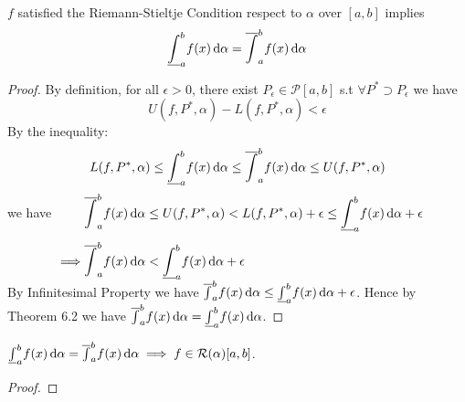 \documentclass[
	UTF-8,
	11pt, %
	a4paper, %
]{LegrandOrangeBook}
\begin{document}
    \newpage

    \newcommand{\lowerint}{\underline{\int}}
    \newcommand{\upperint}{\overline{\int}}

    \begin{lemma}
        $f$ satisfied the
        Riemann-Stieltje Condition respect to $\alpha$ over $[a,b] $ implies
        $$ \underline{\int}_{a}^{b}f(x) \, \mathrm{d} \alpha = \overline{\int}_{a}^{b}f(x) \, \mathrm{d} \alpha$$
    \end{lemma} 

    \begin{proof}
        By definition, for all  $\epsilon > 0$, 
        there exist $P_{\epsilon} \in \mathcal{P}[a,b]$ s.t $\forall P^{*} \supset P_{\epsilon}$ we have
        $$
            U(f,P^{*},\alpha) - L(f,P^{*},\alpha) < \epsilon
        $$
        By the inequality:
        $$
            L(f,P^*,\alpha) \leq \lowerint^{b}_a f(x) \diffd \alpha \leq \upperint^{b}_a f(x) \diffd \alpha \leq U(f,P^*,\alpha)
        $$
        we have
        $
        \begin{aligned}[t]
        &\upperint^{b}_a f(x) \diffd \alpha \leq U(f,P^*,\alpha) < L(f,P^*,\alpha) +\epsilon \leq \lowerint^{b}_a f(x) \diffd \alpha+\epsilon\\[1ex]
        \implies &\upperint^{b}_a f(x) \diffd \alpha < \lowerint^{b}_a f(x) \diffd \alpha + \epsilon
        \end{aligned}
        $\\

        By Infinitesimal Property we have 
        $\upperint^{b}_a f(x) \diffd \alpha \leq \lowerint^{b}_a f(x) \diffd \alpha + \epsilon$.
        Hence by Theorem 6.2 we have $\upperint^{b}_a f(x) \diffd \alpha = \lowerint^{b}_a f(x) \diffd \alpha$.
    \end{proof}

    \begin{lemma}
        $ \underline{\int}_{a}^{b}f(x) \, \mathrm{d} \alpha = \overline{\int}_{a}^{b}f(x) \, \mathrm{d} \alpha \implies f\in \mathcal{R}(\alpha)[a,b]$.
    \end{lemma}

    \begin{proof}
        
    \end{proof}


\stopcontents[part] %
\end{document}
